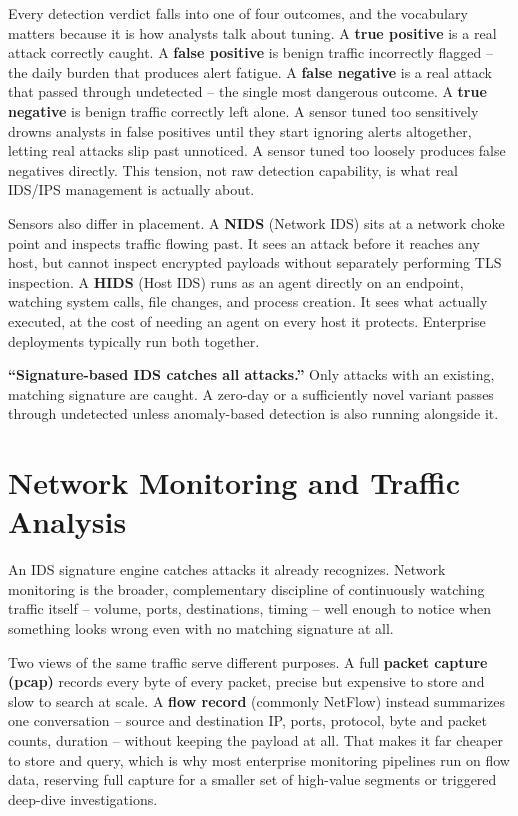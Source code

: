 Every detection verdict falls into one of four outcomes, and the vocabulary matters because it is
how analysts talk about tuning. A \textbf{true positive} is a real attack correctly caught. A
\textbf{false positive} is benign traffic incorrectly flagged -- the daily burden that produces alert
fatigue. A \textbf{false negative} is a real attack that passed through undetected -- the single most
dangerous outcome. A \textbf{true negative} is benign traffic correctly left alone. A sensor
tuned too sensitively drowns analysts in false positives until they start ignoring alerts
altogether, letting real attacks slip past unnoticed. A sensor tuned too loosely produces false
negatives directly. This tension, not raw detection capability, is what real IDS/IPS management is
actually about.

Sensors also differ in placement. A \textbf{NIDS} (Network IDS) sits at a network choke point and
inspects traffic flowing past. It sees an attack before it reaches any host, but cannot inspect
encrypted payloads without separately performing TLS inspection. A \textbf{HIDS} (Host IDS) runs as
an agent directly on an endpoint, watching system calls, file changes, and process creation. It
sees what actually executed, at the cost of needing an agent on every host it protects. Enterprise
deployments typically run both together.

\begin{misconception}
\textbf{``Signature-based IDS catches all attacks.''} Only attacks with an existing, matching
signature are caught. A zero-day or a sufficiently novel variant passes through undetected unless
anomaly-based detection is also running alongside it.
\end{misconception}

\section{Network Monitoring and Traffic Analysis}

An IDS signature engine catches attacks it already recognizes. Network monitoring is the broader,
complementary discipline of continuously watching traffic itself -- volume, ports, destinations,
timing -- well enough to notice when something looks wrong even with no matching signature at all.

Two views of the same traffic serve different purposes. A full \textbf{packet capture (pcap)}
records every byte of every packet, precise but expensive to store and slow to search at scale.
A \textbf{flow record} (commonly NetFlow) instead summarizes one conversation -- source and
destination IP, ports, protocol, byte and packet counts, duration -- without keeping the payload at
all. That makes it far cheaper to store and query, which is why most enterprise monitoring
pipelines run on flow data, reserving full capture for a smaller set of high-value segments or
triggered deep-dive investigations.

